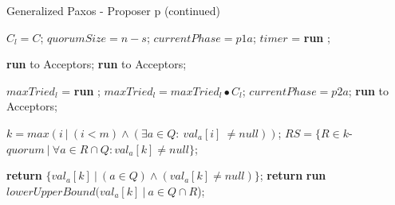 \documentclass[10pt,pdftex,a4paper]{article}%
\begin{document}
\begin{algorithm}
\caption{Generalized Paxos - Proposer p (continued)}
\begin{algorithmic}[1]
        \State $C_l = C$;
        \State $quorumSize = n-s$;
        \State $currentPhase = p1a$;
        \State $timer$ = \textbf{run} ;
        
        \State
            \State \textbf{run}  to Acceptors;
        \Else
            \State \textbf{run}  to Acceptors;
        \EndIf
    \EndFunction
    
    \State
        \State $maxTried_l$ = \textbf{run} ;
        \State $maxTried_l = maxTried_l \bullet C_l$;
        \State $currentPhase = p2a$;
        \State \textbf{run}  to Acceptors;
    \EndFunction
    
    \State
        \State $k = max(i\ |\ (i < m) \wedge (\exists a \in Q :\ val_a[i]\ \neq null))$;
        \State $RS = \{R \in k$-$quorum\ |\ \forall a \in R \cap Q : val_a[k] \neq null\}$;
        
        \State
            \State \textbf{return} $\{val_a[k]\ |\ (a \in Q) \wedge (val_a[k] \neq null)\}$;
        \Else
            \State \textbf{return} \textbf{run} $lowerUpperBound(val_a[k]\ |\ a \in Q \cap R$);
        \EndIf
    \EndFunction
        
\end{algorithmic}
\end{algorithm}
\end{document}
